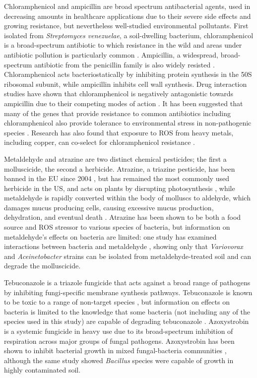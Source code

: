 \documentclass[final,1p,times]{elsarticle}
\begin{document}
Chloramphenicol and ampicillin are broad spectrum antibacterial agents, used in decreasing amounts in healthcare applications due to their severe side effects and growing resistance, but nevertheless well-studied environmental pollutants. First isolated from \textit{Streptomyces venezuelae}, a soil-dwelling bacterium, chloramphenicol is a broad-spectrum antibiotic to which resistance in the wild and areas under antibiotic pollution is particularly common \cite{Allen2010CallEnvironments}. Ampicillin, a widespread, broad-spectrum antibiotic from the penicillin family is also widely resisted \cite{Ruiz1999MechanismsFish}. Chloramphenicol acts bacteriostatically by inhibiting protein synthesis in the 50S ribosomal subunit, while ampicillin inhibits cell wall synthesis. Drug interaction studies have shown that chloramphenicol is negatively antagonistic towards ampicillin due to their competing modes of action \cite{vanBambeke2017MechanismsAction}. It has been suggested that many of the genes that provide resistance to common antibiotics including chloramphenicol also provide tolerance to environmental stress in non-pathogenic species \cite{Groh2007GenesResistance}. Research has also found that exposure to ROS from heavy metals, including copper, can co-select for chloramphenicol resistance \cite{Harrison2009ChromosomalTolerance}.

Metaldehyde and atrazine are two distinct chemical pesticides; the first a molluscicide, the second a herbicide. Atrazine, a triazine pesticide, has been banned in the EU since 2004 \cite{EU2004CommissionSubstance}, but has remained the most commonly used herbicide in the US, and acts on plants by disrupting photosynthesis \cite{Shimabukuro1969AtrazineAction}, while metaldehyde is rapidly converted within the body of molluscs to aldehyde, which damages mucus producing cells, causing excessive mucus production, dehydration, and eventual death \cite{Triebskorn1998}. Atrazine has been shown to be both a food source \cite{Wackett2002BiodegradationStudies} and ROS stressor \cite{Zhang2012OxidativeAtrazine} to various species of bacteria, but information on metaldehyde’s effects on bacteria are limited: one study has examined interactions between bacteria and metaldehyde \cite{Thomas2017IsolationSoils}, showing only that \textit{Variovorax} and \textit{Aceinetobacter} strains can be isolated from metaldehyde-treated soil and can degrade the molluscicide.

Tebuconazole is a triazole fungicide that acts against a broad range of pathogens by inhibiting fungi-specific membrane synthesis pathways. Tebuconazole is known to be toxic to a range of non-target species \cite{Sehnem2010}, but information on effects on bacteria is limited to the knowledge that some bacteria (not including any of the species used in this study) are capable of degrading tebuconazole \cite{Sehnem2010}. Azoxystrobin is a systemic fungicide in heavy use due to its broad-spectrum inhibition of respiration across major groups of fungal pathogens. Azoxystrobin has been shown to inhibit bacterial growth in mixed fungal-bacteria communities \cite{Bacmaga2015MicrobialAzoxystrobin}, although the same study showed \textit{Bacillus} species were capable of growth in highly contaminated soil.
\end{document}
